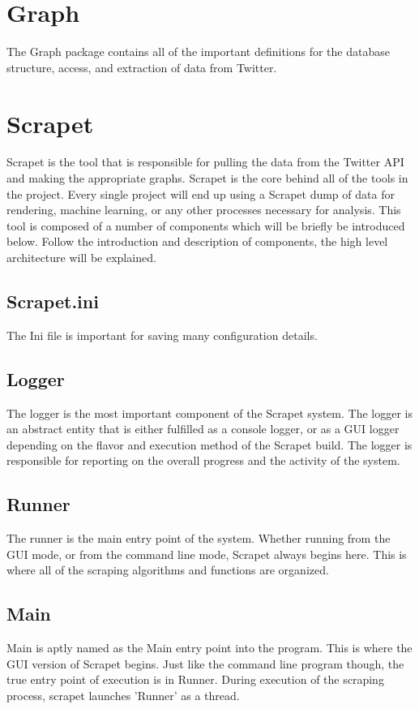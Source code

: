 \section{Graph}
The Graph package contains all of the important definitions for the database structure, access, and extraction of data from Twitter.


\section{Scrapet}
Scrapet is the tool that is responsible for pulling the data from the Twitter API and making the appropriate graphs. Scrapet is the core behind all of the tools in the project. Every single project will end up using a Scrapet dump of data for rendering, machine learning, or any other processes necessary for analysis. This tool is composed of a number of components which will be briefly be introduced below. Follow the introduction and description of components, the high level architecture will be explained.
\subsection{Scrapet.ini}
The Ini file is important for saving many configuration details.
\subsection{Logger}
The logger is the most important component of the Scrapet system. The logger is an abstract entity that is either fulfilled as a console logger, or as a GUI logger depending on the flavor and execution method of the Scrapet build. The logger is responsible for reporting on the overall progress and the activity of the system.
\subsection{Runner}
The runner is the main entry point of the system. Whether running from the GUI mode, or from the command line mode, Scrapet always begins here. This is where all of the scraping algorithms and functions are organized.
\subsection{Main}
Main is aptly named as the Main entry point into the program. This is where the GUI version of Scrapet begins. Just like the command line program though, the true entry point of execution is in Runner. During execution of the scraping process, scrapet launches 'Runner' as a thread.
